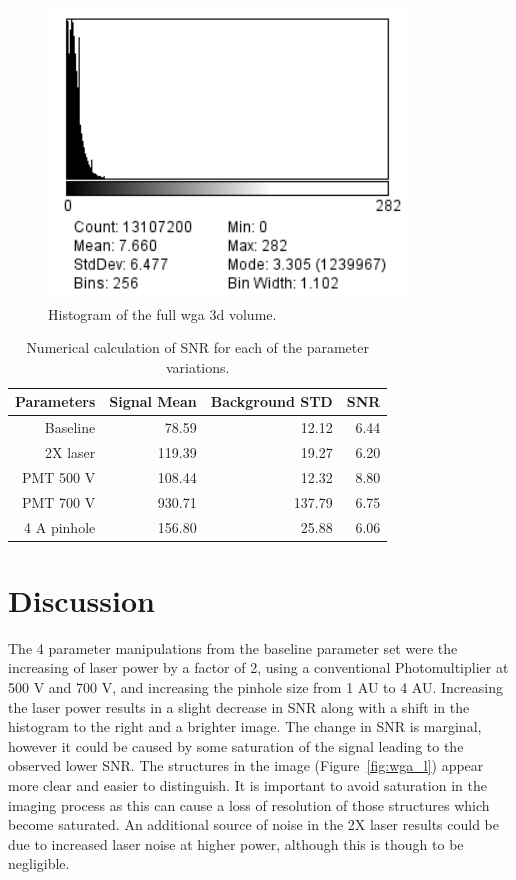 \documentclass[12pt]{article}
\begin{document}
\begin{figure}[H]
	
	\centering
	\includegraphics[width=.75\textwidth]{FinalFigures/zstackHist.png}
	
	\caption{Histogram of the full wga 3d volume.}
	\label{fig:zhist}
\end{figure}


\begin{table}[H]
	\caption{Numerical calculation of SNR for each of the parameter variations.}
	\centering
	\begin{tabular}{|r|r|r|r|} \hline
		
		Parameters&Signal Mean&Background STD&SNR\\
		\hline
		Baseline&78.59&12.12&6.44\\
		2X laser&119.39&19.27&6.20\\
		PMT 500 V&108.44&12.32&8.80\\
		PMT 700 V&930.71&137.79&6.75\\
		4 A pinhole&156.80&25.88&6.06\\
		\hline
	\end{tabular}
	\label{tab:SNR}
\end{table}




\section{Discussion}

The 4 parameter manipulations from the baseline parameter set were the increasing of laser power by a factor of 2, using a conventional Photomultiplier at 500 V and 700 V, and increasing the pinhole size from 1 AU to 4 AU. Increasing the laser power results in a slight decrease in SNR along with a shift in the histogram to the right and a brighter image. The change in SNR is marginal, however it could be caused by some saturation of the signal leading to the observed lower SNR. The structures in the image (Figure~\ref{fig:wga_l}) appear more clear and easier to distinguish. It is important to avoid saturation in the imaging process as this can cause a loss of resolution of those structures which become saturated. An additional source of noise in the 2X laser results could be due to increased laser noise at higher power, although this is though to be negligible.
\end{document}

